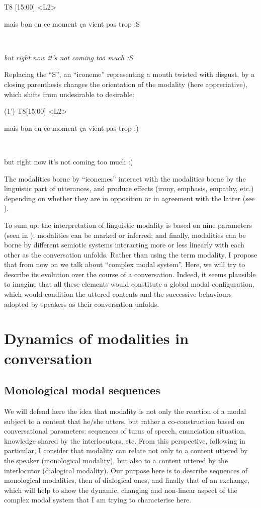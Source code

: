 \documentclass[output=paper]{langscibook}
\begin{document}
\ea 
\label{key}

\ttfamily
\parbox{30mm}{T8 [15:00] <L2>}mais bon en ce moment ça vient pas trop :S
\parbox{30mm}{~}\textsl{but right now it's not coming too much :S}

\z 


Replacing the “S”, an “iconeme” representing a mouth twisted with disgust, by a closing parenthesis changes the orientation of the modality (here appreciative), which shifts from undesirable to desirable: 

\ea 
\ttfamily
\parbox[t]{36mm}{(1’) T8[15:00] <L2>}mais bon en ce moment ça vient pas trop :) 
\parbox[t]{36mm}{~}but right now it's not coming too much :)
\z 

The modalities borne by “iconemes” interact with the modalities borne by the linguistic part of utterances, and produce effects (irony, emphasis, empathy, etc.) depending on whether they are in opposition or in agreement with the latter (see \citealt{Yus2011}).

To sum up: the interpretation of linguistic modality is based on nine parameters (seen in ); modalities can be marked or inferred; and finally, modalities can be borne by different semiotic systems interacting more or less linearly with each other as the conversation unfolds. Rather than using the term modality, I propose that from now on we talk about “complex modal system”. Here, we will try to describe its evolution over the course of a conversation. Indeed, it seems plausible to imagine that all these elements would constitute a global modal configuration, which would condition the uttered contents and the successive behaviours adopted by speakers as their conversation unfolds.

\section{Dynamics of modalities in conversation}
\subsection{Monological modal sequences}

We will defend here the idea that modality is not only the reaction of a modal subject to a content that he/she utters, but rather a co-construction based on conversational parameters: sequences of turns of speech, enunciation situation, knowledge shared by the interlocutors, etc. From this perspective, following \citet{BresNowakowska2006} in particular, I consider that modality can relate not only to a content uttered by the speaker (monological modality), but also to a content uttered by the interlocutor (dialogical modality). Our purpose here is to describe sequences of monological modalities, then of dialogical ones, and finally that of an exchange, which will help to show the dynamic, changing and non-linear aspect of the complex modal system that I am trying to characterise here.
\end{document}
